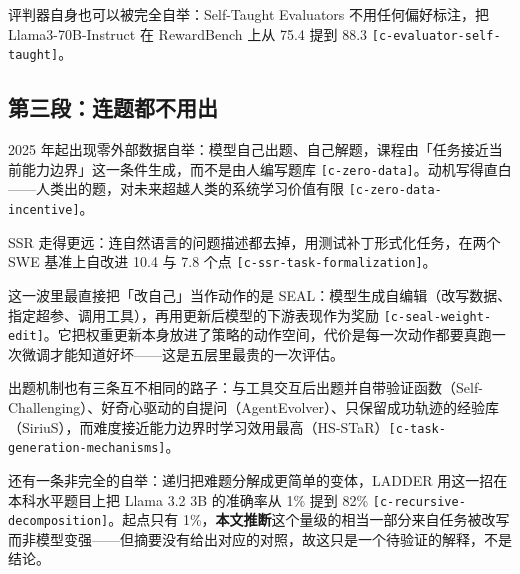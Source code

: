 评判器自身也可以被完全自举：Self-Taught Evaluators 不用任何偏好标注，把 Llama3-70B-Instruct 在 RewardBench 上从 75.4 提到 88.3 {\scriptsize\texttt{[c-\hspace{0pt}evaluator-\hspace{0pt}self-\hspace{0pt}taught]}}。


\subsection{第三段：连题都不用出}

2025 年起出现零外部数据自举：模型自己出题、自己解题，课程由「任务接近当前能力边界」这一条件生成，而不是由人编写题库 {\scriptsize\texttt{[c-\hspace{0pt}zero-\hspace{0pt}data]}}。动机写得直白——人类出的题，对未来超越人类的系统学习价值有限 {\scriptsize\texttt{[c-\hspace{0pt}zero-\hspace{0pt}data-\hspace{0pt}incentive]}}。


SSR 走得更远：连自然语言的问题描述都去掉，用测试补丁形式化任务，在两个 SWE 基准上自改进 10.4 与 7.8 个点 {\scriptsize\texttt{[c-\hspace{0pt}ssr-\hspace{0pt}task-\hspace{0pt}formalization]}}。


这一波里最直接把「改自己」当作动作的是 SEAL：模型生成自编辑（改写数据、指定超参、调用工具），再用更新后模型的下游表现作为奖励 {\scriptsize\texttt{[c-\hspace{0pt}seal-\hspace{0pt}weight-\hspace{0pt}edit]}}。它把权重更新本身放进了策略的动作空间，代价是每一次动作都要真跑一次微调才能知道好坏——这是五层里最贵的一次评估。


出题机制也有三条互不相同的路子：与工具交互后出题并自带验证函数（Self-Challenging）、好奇心驱动的自提问（AgentEvolver）、只保留成功轨迹的经验库（SiriuS），而难度接近能力边界时学习效用最高（HS-STaR）{\scriptsize\texttt{[c-\hspace{0pt}task-\hspace{0pt}generation-\hspace{0pt}mechanisms]}}。


还有一条非完全的自举：递归把难题分解成更简单的变体，LADDER 用这一招在本科水平题目上把 Llama 3.2 3B 的准确率从 1\% 提到 82\% {\scriptsize\texttt{[c-\hspace{0pt}recursive-\hspace{0pt}decomposition]}}。起点只有 1\%，\textbf{本文推断}这个量级的相当一部分来自任务被改写而非模型变强——但摘要没有给出对应的对照，故这只是一个待验证的解释，不是结论。



